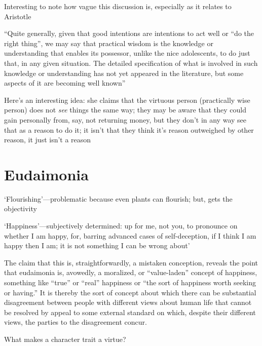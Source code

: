 \documentclass[11pt]{article}
\begin{document}
\noindent Interesting to note how vague this discussion is, especially as it relates to Aristotle
\vspace*{2mm}

\noindent ``Quite generally, given that good intentions are intentions to act well or “do the right thing”, we may say that practical wisdom is the knowledge or understanding that enables its possessor, unlike the nice adolescents, to do just that, in any given situation. The detailed specification of what is involved in such knowledge or understanding has not yet appeared in the literature, but some aspects of it are becoming well known''
\vspace*{2mm}

\noindent Here's an interesting idea: she claims that the virtuous person (practically wise person) does not \emph{see} things the same way; they may be aware that they could gain personally from, say, not returning money, but they don't in any way see that as a reason to do it; it isn't that they think it's  reason outweighed by other reason, it just isn't a reason

\section{Eudaimonia}

\noindent `Flourishing'---problematic because even plants can flourish; but, gets the objectivity
\vspace*{2mm}

\noindent `Happiness'---subjectively determined: up for me, not you, to pronounce on whether I am happy, for, barring advanced cases of self-deception, if I think I am happy then I am; it is not something I can be wrong about'
\vspace*{2mm}

\noindent The claim that this is, straightforwardly, a mistaken conception, reveals the point that eudaimonia is, avowedly, a moralized, or “value-laden” concept of happiness, something like “true” or “real” happiness or “the sort of happiness worth seeking or having.” It is thereby the sort of concept about which there can be substantial disagreement between people with different views about human life that cannot be resolved by appeal to some external standard on which, despite their different views, the parties to the disagreement concur.
\vspace*{2mm}

\noindent What makes a character trait a virtue?
\end{document}
